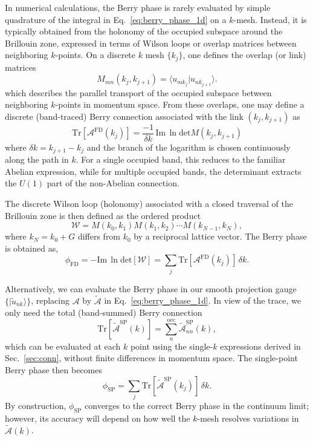 \documentclass[galley,aps,pra,10pt,amsmath,amssymb,
    superscriptaddress,nofootinbib,longbibliography]{revtex4-2}
\begin{document}
In numerical calculations, the Berry phase is rarely evaluated by simple quadrature of the integral in Eq.~\eqref{eq:berry_phase_1d} on a $k$-mesh. Instead, it is typically obtained from the holonomy of the occupied subspace around the Brillouin zone, expressed in terms of Wilson loops or overlap matrices between neighboring $k$-points.
On a discrete $k$ mesh $\{k_j\}$, one defines the overlap (or link) matrices
\begin{equation}
\label{eq:overlap_matrix}
M_{mn}(k_j,k_{j+1}) = \langle u_{m k_j} | u_{n k_{j+1}} \rangle .
\end{equation}
which describes the parallel transport of the occupied subspace between neighboring $k$-points in momentum space. From these overlaps, one may define a discrete (band-traced) Berry connection associated with the link $(k_j, k_{j+1})$ as 
\begin{equation}
    \label{eq:discrete_connection}
    \mathrm{Tr}[\mathcal{A}^{\mathrm{FD}}(k_j)] = \frac{-1}{\delta k} \,\mathrm{Im} \, \ln \text{det} M(k_j, k_{j+1})
\end{equation}
where $\delta k  = k_{j+1} - k_j$ and the branch of the logarithm is chosen continuously along the path in $k$. For a single occupied band, this reduces to the familiar Abelian expression, while for multiple occupied bands, the determinant extracts the $U(1)$ part of the non-Abelian connection. 

The discrete Wilson loop (holonomy) associated with a closed traversal of the Brillouin zone is then defined as the ordered product
\begin{equation}
\label{eq:wilson_loop}
\mathcal{W} = M(k_0,k_1) M(k_1,k_2) \cdots M(k_{N-1},k_N),
\end{equation}
where $k_N = k_0 + G$ differs from $k_0$ by a reciprocal lattice vector. The Berry phase is obtained as,
\begin{equation}
\label{eq:berryphase_discretized}
\phi_{\mathrm{FD}}= - \mathrm{Im} \, \ln \text{det} \left[ \mathcal{W} \right]
   = \sum_j \mathrm{Tr}[\mathcal{A}^{\mathrm{FD}}(k_j)] \,\delta k .
\end{equation}

Alternatively, we can evaluate the Berry phase in our smooth projection gauge $\{|\tilde u_{n k}\rangle\}$, replacing $\mathcal{A}$ by $\tilde{\mathcal{A}}$ in Eq.~\eqref{eq:berry_phase_1d}. In view of the trace, we only need the total (band-summed) Berry connection
\begin{equation}
\mathrm{Tr}[\tilde{\mathcal{A}}^{\mathrm{SP}}(k)]
= \sum_n^{\mathrm{occ}} \tilde{\mathcal{A}}^{\mathrm{SP}}_{nn}(k) ,
\end{equation}
which can be evaluated at each $k$ point using the single-$k$ expressions derived in Sec.~\ref{sec:conn}, without finite differences in momentum space. The single-point Berry phase then becomes
\begin{equation}
\label{eq:riemann_sum}
\phi_{\text{SP}} = \sum_{j} \mathrm{Tr}[\tilde{\mathcal{A}}^{\mathrm{SP}}(k_j)]\,\delta k .
\end{equation}
By construction, $\phi_{\text{SP}}$ converges to the correct Berry phase in the continuum limit; however, its accuracy will depend on how well the $k$-mesh resolves variations in $\tilde{\mathcal{A}}(k)$.
\end{document}
